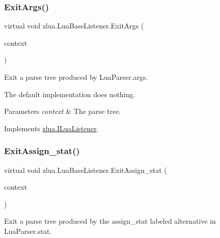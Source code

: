 \subsubsection{\texorpdfstring{Exit\+Args()}{ExitArgs()}}
{\footnotesize\ttfamily virtual void zlua.\+Lua\+Base\+Listener.\+Exit\+Args (\begin{DoxyParamCaption}\item[{\mbox{[}\+Not\+Null\mbox{]} \mbox{\hyperlink{classzlua_1_1_lua_parser_1_1_args_context}{Lua\+Parser.\+Args\+Context}}}]{context }\end{DoxyParamCaption})\hspace{0.3cm}{\ttfamily [virtual]}}



Exit a parse tree produced by Lua\+Parser.\+args. 

The default implementation does nothing.


\begin{DoxyParams}{Parameters}
{\em context} & The parse tree.\\
\hline
\end{DoxyParams}


Implements \mbox{\hyperlink{interfacezlua_1_1_i_lua_listener_ad480b971cdba492e0fb0221dc80bb690}{zlua.\+I\+Lua\+Listener}}.

\mbox{\label{classzlua_1_1_lua_base_listener_a84ee6c5b5c661dee72a99902d27ee46e}} 
\subsubsection{\texorpdfstring{Exit\+Assign\+\_\+stat()}{ExitAssign\_stat()}}
{\footnotesize\ttfamily virtual void zlua.\+Lua\+Base\+Listener.\+Exit\+Assign\+\_\+stat (\begin{DoxyParamCaption}\item[{\mbox{[}\+Not\+Null\mbox{]} \mbox{\hyperlink{classzlua_1_1_lua_parser_1_1_assign__stat_context}{Lua\+Parser.\+Assign\+\_\+stat\+Context}}}]{context }\end{DoxyParamCaption})\hspace{0.3cm}{\ttfamily [virtual]}}



Exit a parse tree produced by the {\ttfamily assign\+\_\+stat} labeled alternative in Lua\+Parser.\+stat. 

